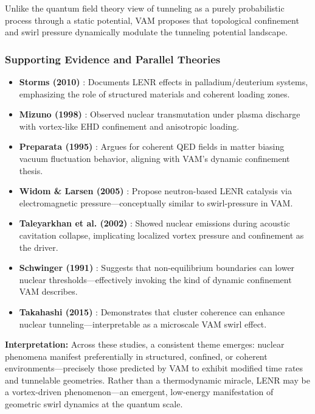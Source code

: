 Unlike the quantum field theory view of tunneling as a purely probabilistic process through a static potential, VAM proposes that topological confinement and swirl pressure dynamically modulate the tunneling potential landscape.

\subsubsection{Supporting Evidence and Parallel Theories}

\begin{itemize}
    \item \textbf{Storms (2010)} \cite{storms2010}: Documents LENR effects in palladium/deuterium systems, emphasizing the role of structured materials and coherent loading zones.

    \item \textbf{Mizuno (1998)} \cite{mizuno1998}: Observed nuclear transmutation under plasma discharge with vortex-like EHD confinement and anisotropic loading.

    \item \textbf{Preparata (1995)} \cite{preparata1995}: Argues for coherent QED fields in matter biasing vacuum fluctuation behavior, aligning with VAM’s dynamic confinement thesis.

    \item \textbf{Widom \& Larsen (2005)} \cite{widom2005}: Propose neutron-based LENR catalysis via electromagnetic pressure---conceptually similar to swirl-pressure in VAM.

    \item \textbf{Taleyarkhan et al. (2002)} \cite{taleyarkhan2002}: Showed nuclear emissions during acoustic cavitation collapse, implicating localized vortex pressure and confinement as the driver.

    \item \textbf{Schwinger (1991)} \cite{schwinger1991}: Suggests that non-equilibrium boundaries can lower nuclear thresholds---effectively invoking the kind of dynamic confinement VAM describes.

    \item \textbf{Takahashi (2015)} \cite{takahashi2015}: Demonstrates that cluster coherence can enhance nuclear tunneling---interpretable as a microscale VAM swirl effect.
\end{itemize}

\textbf{Interpretation:} Across these studies, a consistent theme emerges: nuclear phenomena manifest preferentially in structured, confined, or coherent environments---precisely those predicted by VAM to exhibit modified time rates and tunnelable geometries. Rather than a thermodynamic miracle, LENR may be a vortex-driven phenomenon—an emergent, low-energy manifestation of geometric swirl dynamics at the quantum scale.